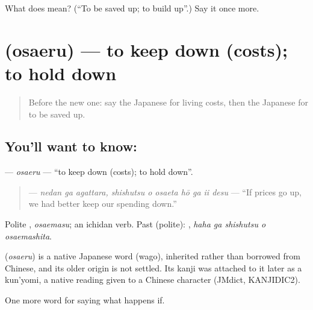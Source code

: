 \begin{tcolorbox}[breakable,colback=teal!4,colframe=teal!35!black,title={Before you move on}]
What does  mean? (\textquotedblleft{}To be saved up; to build up\textquotedblright{}.) Say it once more.
\end{tcolorbox}
\section[\texorpdfstring{\ja{おさえる} (osaeru)}{おさえる (osaeru)}]{ (osaeru) — to keep down (costs); to hold down}

\label{lesson:JA-C360-osaeru}



\begin{quote}
Before the new one: say the Japanese for living costs, then the Japanese for to be saved up.
\end{quote}

\subsection*{You'll want to know: }
\textbf{} — \emph{osaeru} — \textquotedblleft{}to keep down (costs); to hold down\textquotedblright{}.

\begin{quote}
\textbf{    } — \emph{nedan ga agattara, shishutsu o osaeta hō ga ii desu} — \textquotedblleft{}If prices go up, we had better keep our spending down.\textquotedblright{}
\end{quote}

Polite \textbf{}, \emph{osaemasu}; an ichidan verb. Past (polite): \textbf{  }, \emph{haha ga shishutsu o osaemashita}.

\begin{cousinweb}
\textbf{} (\emph{osaeru}) is a native Japanese word (wago), inherited rather than borrowed from Chinese, and its older origin is not settled. Its kanji was attached to it later as a kun'yomi, a native reading given to a Chinese character (JMdict, KANJIDIC2).
\end{cousinweb}

\begin{grammarlens}[title={What you've built}]
One more word for saying what happens if.
\end{grammarlens}

